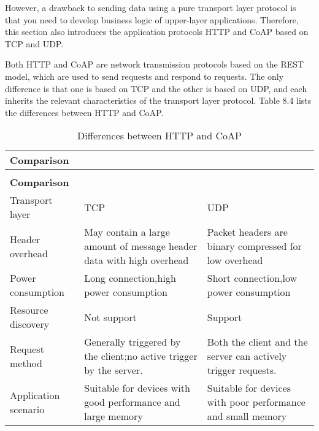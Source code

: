\documentclass[a4paper,12pt]{book}
\begin{document}
However, a drawback to sending data using a pure transport layer protocol is that you need to develop business logic of upper-layer applications. Therefore, this section also introduces the application protocols HTTP and CoAP based on TCP and UDP.

Both HTTP and CoAP are network transmission protocols based on the REST model, which are used to send requests and respond to requests. The only difference is that one is based on TCP and the other is based on UDP, and each inherits the relevant characteristics of the transport layer protocol. Table 8.4 lists the differences between HTTP and CoAP.

{\renewcommand{\arraystretch}{1.2}
\begin{longtable}{|>{\Centering}m{6em}|>{\RaggedRight}m{16em}|>{\RaggedRight}m{16em}|}
    \caption{Differences between HTTP and CoAP \label{8.4}} \\
        
    \hline
    \rowcolor{LightBlue} \textbf{Comparison}&\multicolumn{1}{c|}{\textbf{HTTP}}&\multicolumn{1}{c|}{\textbf{CoAP}}\\
    \hline
    \endfirsthead

    \multicolumn{3}{r}{Continuation of Table \ref{8.4}}\\
    \hline
    \rowcolor{LightBlue} \textbf{Comparison}&\multicolumn{1}{c|}{\textbf{HTTP}}&\multicolumn{1}{c|}{\textbf{CoAP}}\\
    \hline
    \endhead
        
    Transport layer&TCP&UDP\\
    \hline
    Header overhead&May contain a large amount of message header data with high overhead&Packet headers are binary compressed for low overhead\\
    \hline
    Power consumption&Long connection,\newline high power consumption&Short connection,\newline low power consumption\\
    \hline
    Resource discovery&Not support&Support\\
    \hline
    Request method&Generally triggered by the client;\newline no active trigger by the server.&Both the client and the server can actively trigger requests.\\
    \hline
    Application scenario&Suitable for devices with good performance and large memory&Suitable for devices with poor performance and small memory\\
    \hline
\end{longtable}
}
\end{document}
